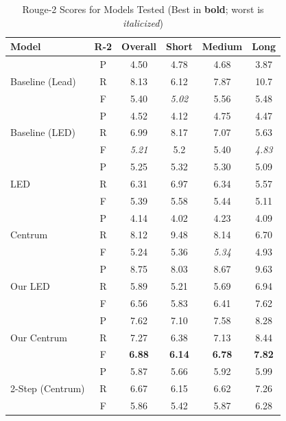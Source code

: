 \documentclass[12pt, twocolumn]{article}
\numberwithin{equation}{section}
\begin{document}
\begin{table}
    \centering
    \footnotesize
    \begin{tabular}{|p{1.5cm}|c|c|c|c|c|}
    \hline
        Model & R-2 & Overall & Short & Medium & Long \\ \hline
        \multirow{3}{1.5cm}{Baseline (Lead)} & P & 4.50 & 4.78 & 4.68 & 3.87 \\ \cline{2-6}
        & R & 8.13 & 6.12 & 7.87 & 10.7 \\ \cline{2-6}
        & F & 5.40 & \textit{5.02} & 5.56 & 5.48 \\ \hline
        \multirow{3}{1.5cm}{Baseline (LED)} & P & 4.52 & 4.12 & 4.75 & 4.47 \\ \cline{2-6}
        ~ & R & 6.99 & 8.17 & 7.07 & 5.63 \\ \cline{2-6}
        ~ & F & \textit{5.21} & 5.2 & 5.40 & \textit{4.83} \\ \hline
        \multirow{3}{1.5cm}{LED} & P & 5.25 & 5.32 & 5.30 & 5.09 \\ \cline{2-6}
        ~ & R & 6.31 & 6.97 & 6.34 & 5.57 \\ \cline{2-6}
        ~ & F & 5.39 & 5.58 & 5.44 & 5.11 \\ \hline
        \multirow{3}{1.5cm}{Centrum} & P & 4.14 & 4.02 & 4.23 & 4.09 \\ \cline{2-6}
        ~ & R & 8.12 & 9.48 & 8.14 & 6.70 \\ \cline{2-6}
        ~ & F & 5.24 & 5.36 & \textit{5.34} & 4.93 \\ \hline
        \multirow{3}{1.5cm}{Our LED} & P & 8.75 & 8.03 & 8.67 & 9.63 \\ \cline{2-6}
        ~ & R & 5.89 & 5.21 & 5.69 & 6.94 \\ \cline{2-6}
        ~ & F & 6.56 & 5.83 & 6.41 & 7.62 \\ \hline
        \multirow{3}{1.5cm}{Our Centrum} & P & 7.62 & 7.10 & 7.58 & 8.28 \\ \cline{2-6}
        ~ & R & 7.27 & 6.38 & 7.13 & 8.44 \\ \cline{2-6}
        ~ & F & \textbf{6.88} & \textbf{6.14} & \textbf{6.78} & \textbf{7.82} \\ \hline
        \multirow{3}{1.5cm}{2-Step (Centrum)} & P & 5.87 & 5.66 & 5.92 & 5.99 \\ \cline{2-6}
        ~ & R & 6.67 & 6.15 & 6.62 & 7.26 \\ \cline{2-6}
        ~ & F & 5.86 & 5.42 & 5.87 & 6.28 \\ \hline
    \end{tabular}
    \caption{Rouge-2 Scores for Models Tested (Best in \textbf{bold}; worst is \textit{italicized})}
    \label{tab:rouge-2}
\end{table}
\end{document}
